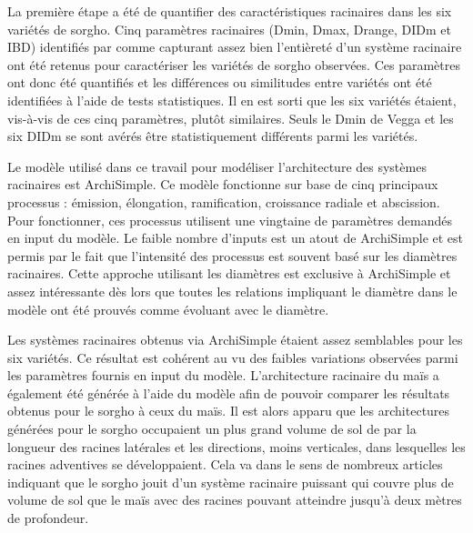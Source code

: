 La première étape a été de quantifier des caractéristiques racinaires dans les six variétés de sorgho.
Cinq paramètres racinaires (Dmin, Dmax, Drange, DIDm et IBD) identifiés par \cite{pages_seeking_2018} comme capturant assez bien l'entièreté d'un système racinaire ont été retenus pour caractériser les variétés de sorgho observées.
Ces paramètres ont donc été quantifiés et les différences ou similitudes entre variétés ont été identifiées à l'aide de tests statistiques.
Il en est sorti que les six variétés étaient, vis-à-vis de ces cinq paramètres, plutôt similaires.
Seuls le Dmin de Vegga et les six DIDm se sont avérés être statistiquement différents parmi les variétés.
\newline

Le modèle utilisé dans ce travail pour modéliser l'architecture des systèmes racinaires est ArchiSimple.
Ce modèle fonctionne sur base de cinq principaux processus : émission, élongation, ramification, croissance radiale et abscission.
Pour fonctionner, ces processus utilisent une vingtaine de paramètres demandés en input du modèle.
Le faible nombre d'inputs est un atout de ArchiSimple et est permis par le fait que l'intensité des processus est souvent basé sur les diamètres racinaires.
Cette approche utilisant les diamètres est exclusive à ArchiSimple et assez intéressante dès lors que toutes les relations impliquant le diamètre dans le modèle ont été prouvés comme évoluant avec le diamètre.
\newline

Les systèmes racinaires obtenus via ArchiSimple étaient assez semblables pour les six variétés.
Ce résultat est cohérent au vu des faibles variations observées parmi les paramètres fournis en input du modèle.
L'architecture racinaire du maïs a également été générée à l'aide du modèle afin de pouvoir comparer les résultats obtenus pour le sorgho à ceux du maïs.
Il est alors apparu que les architectures générées pour le sorgho occupaient un plus grand volume de sol de par la longueur des racines latérales et les directions, moins verticales, dans lesquelles les racines adventives se développaient.
Cela va dans le sens de nombreux articles indiquant que le sorgho jouit d'un système racinaire puissant qui couvre plus de volume de sol que le maïs avec des racines pouvant atteindre jusqu'à deux mètres de profondeur.
\newline

